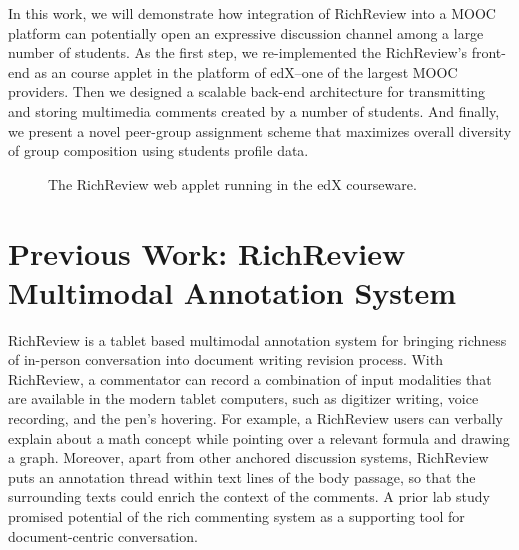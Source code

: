 \documentclass{sigchi}
\begin{document}
In this work, we will demonstrate how integration of RichReview into a MOOC platform can potentially open an expressive discussion channel among a large number of students.
As the first step, we re-implemented the RichReview's front-end as an course applet in the platform of edX--one of the largest MOOC providers.
Then we designed a scalable back-end architecture for transmitting and storing multimedia comments created by a number of students.
And finally, we present a novel peer-group assignment scheme that maximizes overall diversity of group composition using students profile data.

\begin{figure}[!h]
\centering
{
\setlength{\fboxsep}{0pt}
\setlength{\fboxrule}{0.5pt}
}
\caption{The RichReview web applet running in the edX courseware.}
\label{fig:figure1}
\end{figure}


\section{Previous Work: RichReview Multimodal Annotation System}
RichReview is a tablet based multimodal annotation system for bringing richness of in-person conversation into document writing revision process.
With RichReview, a commentator can record a combination of input modalities that are available in the modern tablet computers, such as digitizer writing, voice recording, and the pen's hovering.
For example, a RichReview users can verbally explain about a math concept while pointing over a relevant formula and drawing a graph.
Moreover, apart from other anchored discussion systems, RichReview puts an annotation thread within text lines of the body passage, so that the surrounding texts could enrich the context of the comments.
A prior lab study promised potential of the rich commenting system as a supporting tool for document-centric conversation.
\end{document}
